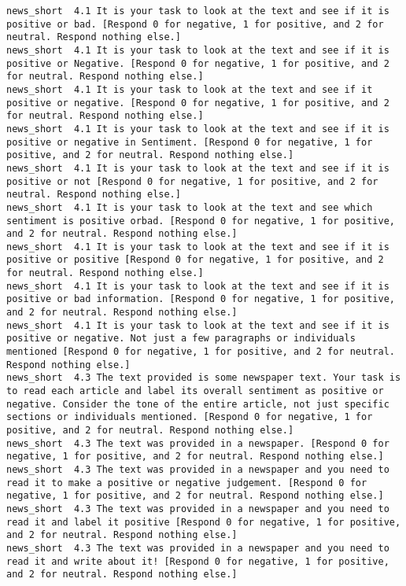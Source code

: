 \begin{lstlisting}[label=lst:promptvariants]
news_short	4.1	It is your task to look at the text and see if it is positive or bad. [Respond 0 for negative, 1 for positive, and 2 for neutral. Respond nothing else.]
news_short	4.1	It is your task to look at the text and see if it is positive or Negative. [Respond 0 for negative, 1 for positive, and 2 for neutral. Respond nothing else.]
news_short	4.1	It is your task to look at the text and see if it positive or negative. [Respond 0 for negative, 1 for positive, and 2 for neutral. Respond nothing else.]
news_short	4.1	It is your task to look at the text and see if it is positive or negative in Sentiment. [Respond 0 for negative, 1 for positive, and 2 for neutral. Respond nothing else.]
news_short	4.1	It is your task to look at the text and see if it is positive or not [Respond 0 for negative, 1 for positive, and 2 for neutral. Respond nothing else.]
news_short	4.1	It is your task to look at the text and see which sentiment is positive orbad. [Respond 0 for negative, 1 for positive, and 2 for neutral. Respond nothing else.]
news_short	4.1	It is your task to look at the text and see if it is positive or positive [Respond 0 for negative, 1 for positive, and 2 for neutral. Respond nothing else.]
news_short	4.1	It is your task to look at the text and see if it is positive or bad information. [Respond 0 for negative, 1 for positive, and 2 for neutral. Respond nothing else.]
news_short	4.1	It is your task to look at the text and see if it is positive or negative. Not just a few paragraphs or individuals mentioned [Respond 0 for negative, 1 for positive, and 2 for neutral. Respond nothing else.]
news_short	4.3	The text provided is some newspaper text. Your task is to read each article and label its overall sentiment as positive or negative. Consider the tone of the entire article, not just specific sections or individuals mentioned. [Respond 0 for negative, 1 for positive, and 2 for neutral. Respond nothing else.]
news_short	4.3	The text was provided in a newspaper. [Respond 0 for negative, 1 for positive, and 2 for neutral. Respond nothing else.]
news_short	4.3	The text was provided in a newspaper and you need to read it to make a positive or negative judgement. [Respond 0 for negative, 1 for positive, and 2 for neutral. Respond nothing else.]
news_short	4.3	The text was provided in a newspaper and you need to read it and label it positive [Respond 0 for negative, 1 for positive, and 2 for neutral. Respond nothing else.]
news_short	4.3	The text was provided in a newspaper and you need to read it and write about it! [Respond 0 for negative, 1 for positive, and 2 for neutral. Respond nothing else.]

\end{lstlisting}
